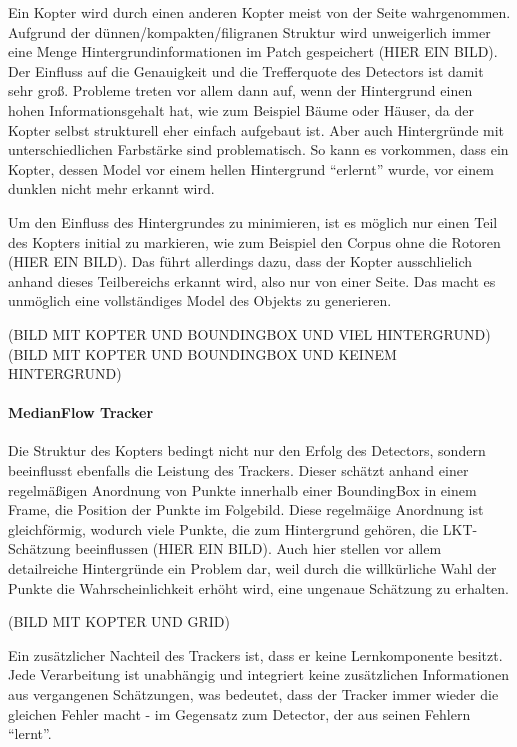 Ein Kopter wird durch einen anderen Kopter meist von der Seite wahrgenommen. Aufgrund der dünnen/kompakten/filigranen Struktur wird unweigerlich immer eine Menge Hintergrundinformationen im Patch gespeichert (HIER EIN BILD). Der Einfluss auf die Genauigkeit und die Trefferquote des Detectors ist damit sehr groß. Probleme treten vor allem dann auf, wenn der Hintergrund einen hohen Informationsgehalt hat, wie zum Beispiel Bäume oder Häuser, da der Kopter selbst strukturell eher einfach aufgebaut ist. Aber auch Hintergründe mit unterschiedlichen Farbstärke sind problematisch. So kann es vorkommen, dass ein Kopter, dessen Model vor einem hellen Hintergrund ``erlernt'' wurde, vor einem dunklen nicht mehr erkannt wird. 

Um den Einfluss des Hintergrundes zu minimieren, ist es möglich nur einen Teil des Kopters initial zu markieren, wie zum Beispiel den Corpus ohne die Rotoren (HIER EIN BILD). Das führt allerdings dazu, dass der Kopter ausschlielich anhand dieses Teilbereichs erkannt wird, also nur von einer Seite. Das macht es unmöglich eine vollständiges Model des Objekts zu generieren.

(BILD MIT KOPTER UND BOUNDINGBOX UND VIEL HINTERGRUND)
(BILD MIT KOPTER UND BOUNDINGBOX UND KEINEM HINTERGRUND)

\paragraph{MedianFlow Tracker}
Die Struktur des Kopters bedingt nicht nur den Erfolg des Detectors, sondern beeinflusst ebenfalls die Leistung des Trackers. Dieser schätzt anhand einer regelmäßigen Anordnung von Punkte innerhalb einer BoundingBox in einem Frame, die Position der Punkte im Folgebild. Diese regelmäige Anordnung ist gleichförmig, wodurch viele Punkte, die zum Hintergrund gehören, die LKT-Schätzung beeinflussen (HIER EIN BILD). Auch hier stellen vor allem detailreiche Hintergründe ein Problem dar, weil durch die willkürliche Wahl der Punkte die Wahrscheinlichkeit erhöht wird, eine ungenaue Schätzung zu erhalten.

(BILD MIT KOPTER UND GRID)

Ein zusätzlicher Nachteil des Trackers ist, dass er keine Lernkomponente besitzt. Jede Verarbeitung ist unabhängig und integriert keine zusätzlichen Informationen aus vergangenen Schätzungen, was bedeutet, dass der Tracker immer wieder die gleichen Fehler macht - im Gegensatz zum Detector, der aus seinen Fehlern ``lernt''. 

